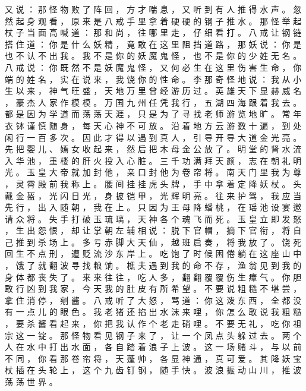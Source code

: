 {又 说 ： 那 怪 物 败 了 阵 回 ， 方 才 喘 息 ， 又 听 到 有 人 推 得 水 声 。
忽 然 起 身 观 看 ， 原 来 是 八 戒 手 里 拿 着 硬 硬 的 钢 子 推 水 。
那 怪 举 起 杖 子 当 面 高 喊 道 ： 那 和 尚 ， 往 哪 里 走 ， 仔 细 看 打 。
八 戒 让 钢 链 搭 住 道 ： 你 是 什 么 妖 精 ， 竟 敢 在 这 里 阻 挡 道 路 ， 那 妖 说 ： 你 是 也 不 认 不 出 我 。
我 不 是 你 的 妖 魔 鬼 怪 ， 也 不 是 你 的 少 姓 无 名 。
八 戒 说 ： 你 既 然 不 是 妖 魔 鬼 怪 ， 又 何 必 生 在 这 里 伤 害 生 命 ， 你 端 的 姓 名 ， 实 在 说 来 ， 我 饶 你 的 性 命 。
李 那 奇 怪 地 说 ： 我 从 小 生 以 来 ， 神 气 旺 盛 ， 天 地 万 里 曾 经 游 历 过 。
英 雄 天 下 显 赫 威 名 ， 豪 杰 人 家 作 模 模 。
万 国 九 州 任 凭 我 行 ， 五 湖 四 海 跟 着 我 去 。
都 是 因 为 学 道 而 荡 荡 天 涯 ， 只 是 为 了 寻 找 老 师 游 览 地 旷 。
常 年 衣 钵 谨 慎 随 身 ， 每 天 心 神 不 可 放 。
沿 着 地 方 云 游 数 十 遍 ， 到 处 闲 行 一 百 多 次 。
因 此 才 得 以 遇 到 真 人 ， 引 导 开 导 大 道 金 光 亮 。
先 把 婴 儿 、 嫣 女 收 起 来 ， 然 后 把 木 母 金 公 放 了 。
明 堂 的 肾 水 流 入 华 池 ， 重 楼 的 肝 火 投 入 心 脏 。
三 千 功 满 拜 天 颜 ， 志 在 朝 礼 明 光 。
玉 皇 大 帝 就 加 封 他 ， 亲 口 封 他 为 卷 帘 将 。
南 天 门 里 我 为 尊 ， 灵 霄 殿 前 我 称 上 。
腰 间 挂 挂 虎 头 牌 ， 手 中 拿 着 定 降 妖 杖 。
头 戴 金 盔 ， 光 闪 日 光 ， 身 披 铠 甲 ， 光 辉 明 亮 。
往 来 护 驾 ， 我 应 当 先 行 ， 出 入 随 朝 ， 我 在 上 。
只 因 为 王 母 降 蟠 桃 ， 在 瑶 池 设 宴 邀 请 众 将 。
失 手 打 破 玉 琉 璃 ， 天 神 各 个 魂 飞 而 死 。
玉 皇 立 即 发 怒 ， 生 出 怨 恨 ， 却 让 掌 朝 左 辅 相 说 ： 脱 下 官 帽 ， 摘 下 官 衔 ， 将 自 己 推 到 杀 场 上 。
多 亏 赤 脚 大 天 仙 ， 越 班 启 奏 ， 将 我 放 了 。
饶 死 回 生 不 点 刑 ， 遭 贬 流 沙 东 岸 上 。
吃 饱 了 时 候 困 倦 躺 在 这 座 山 中 ， 饿 了 就 翻 波 寻 找 粮 饷 。
樵 夫 遇 到 我 的 命 不 存 ， 渔 翁 见 到 我 的 身 体 都 丧 失 了 。
来 来 往 往 ， 吃 人 多 ， 翻 翻 覆 覆 伤 生 瘴 气 。
你 胆 敢 行 凶 到 我 家 ， 今 天 我 的 肚 皮 有 所 希 望 。
不 要 说 粗 糙 不 堪 尝 ， 拿 住 消 停 ， 剜 酱 。
八 戒 听 了 大 怒 ， 骂 道 ： 你 这 泼 东 西 ， 全 都 没 有 一 点 儿 的 眼 色 。
我 老 猪 还 掐 出 水 沫 来 哩 ， 你 怎 么 敢 说 我 粗 糙 ， 要 杀 酱 看 起 来 ， 你 把 我 认 作 个 老 走 硝 哩 。
不 要 无 礼 ， 吃 你 祖 宗 这 一 锭 。
那 怪 物 看 见 钢 子 来 了 ， 让 一 个 凤 点 头 躲 过 去 。
两 个 人 在 水 中 打 出 水 面 ， 各 自 踏 着 浪 子 上 波 。
这 一 场 赌 斗 ， 与 以 前 不 同 ， 你 看 那 卷 帘 将 ， 天 蓬 帅 ， 各 显 神 通 ， 真 可 爱 。
其 降 妖 宝 杖 插 在 头 轮 上 ， 这 个 九 齿 钉 钢 ， 随 手 快 。
波 浪 振 动 山 川 ， 推 波 荡 荡 世 界 。
}
